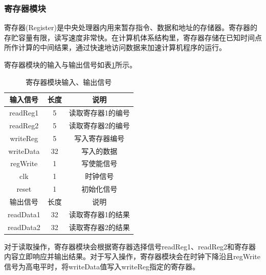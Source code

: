 \documentclass[UTF8]{ctexart}
\begin{document}
\subsubsection{寄存器模块}
    寄存器(Register)是中央处理器内用来暂存指令、数据和地址的存储器。寄存器的存贮容量有限，读写速度非常快。在计算机体系结构里，寄存器存储在已知时间点所作计算的中间结果，通过快速地访问数据来加速计算机程序的运行。\par
    寄存器模块的输入与输出信号如表\ref{tab:reg-input-output-sig}所示。
    \begin{table}[H]
        \centering
        \begin{tabular}{|c|c|c|}
        \hline
        输入信号 & 长度 & 说明 \\
        \hline
        readReg1 & 5 & 读取寄存器1的编号 \\
        readReg2 & 5 & 读取寄存器2的编号 \\
        writeReg & 5 & 写入寄存器编号 \\
        writeData & 32 & 写入的数据 \\
        regWrite & 1 & 写使能信号 \\
        clk & 1 & 时钟信号\\
        reset & 1 & 初始化信号\\
        \hline
        \hline
        输出信号 & 长度 & 说明 \\ \hline
        readData1 & 32 & 读取寄存器1的结果 \\
        readData2 & 32 & 读取寄存器2的结果 \\ \hline
        \end{tabular}
        \caption{寄存器模块输入、输出信号}
        \label{tab:reg-input-output-sig}
    \end{table}\par
    对于读取操作，寄存器模块会根据寄存器选择信号readReg1、readReg2和寄存器内容立即响应并输出结果。对于写入操作，寄存器模块会在时钟下降沿且regWrite信号为高电平时，将writeData值写入writeReg指定的寄存器。
\end{document}
